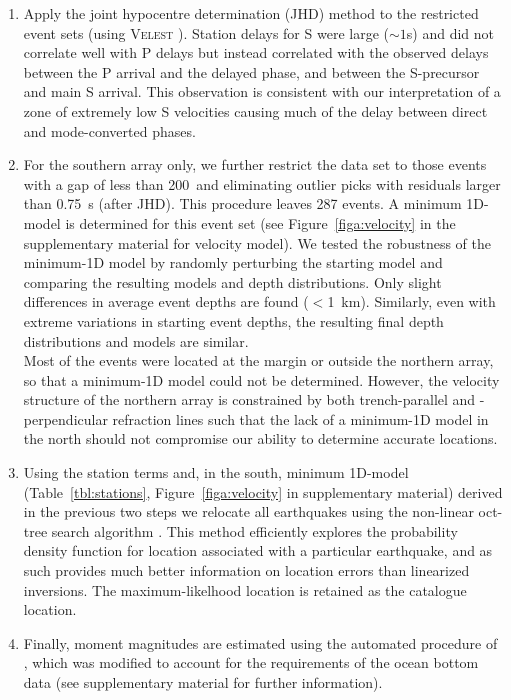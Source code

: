 \documentclass[reviewcopy]{elsart}
\begin{document}
\begin{enumerate}
\item Apply the joint
  hypocentre determination (JHD) method to the restricted event sets (using
  \textsc{Velest} \citep{kissling94}).  Station delays for S were large ($\sim 1$s) and did
  not correlate well with P delays but instead correlated with
  the observed delays between the P arrival and the delayed phase, and
between the S-precursor and main S arrival.  This observation is consistent
  with our interpretation of a zone of extremely low S velocities
  causing much of the delay between direct and mode-converted phases. 
\item For the southern array only, we further restrict the data set to
  those events with a gap of less than 200\dg\ and eliminating outlier
  picks 
  with residuals larger than 0.75~s (after JHD).
% 
  This procedure leaves 287 events. A minimum 1D-model is determined
  for this event set \citep{kissling94} (see Figure~\ref{figa:velocity} in the supplementary material for velocity
model).  We tested the robustness of the minimum-1D
  model by randomly perturbing the starting model and comparing the resulting models and depth distributions.
  Only slight differences in average event depths are found
  ($<$1~km). Similarly, even with extreme variations in starting event
  depths,
 the resulting final depth distributions and models are
  similar. \\
  Most of the events were located at the margin or outside the
  northern array, so that a minimum-1D model could not be determined.
  However, the velocity structure of the northern array is
  constrained by both trench-parallel and -perpendicular refraction
  lines \citep{scherwath06,contreras-reyes07}
such
  that the lack of a minimum-1D model in the north should not
  compromise our ability to determine accurate
  locations. 
\item Using the station terms and, in the south, minimum 1D-model
  (Table~\ref{tbl:stations}, Figure~\ref{figa:velocity} in supplementary material)
  derived in the previous two steps we relocate all earthquakes using
  the non-linear oct-tree search algorithm \citep{lomax00}.  This method efficiently
  explores the probability density function for location associated
  with a particular earthquake, and as such provides much better
  information on location errors than linearized inversions.  The
  maximum-likelhood location is retained as the catalogue location. 
\item 
Finally, moment magnitudes are estimated using the automated procedure
of \citet{ottemoeller03}, which was modified to account for the
requirements of the ocean bottom data (see supplementary material for
further information).  
\end{enumerate}
\end{document}
